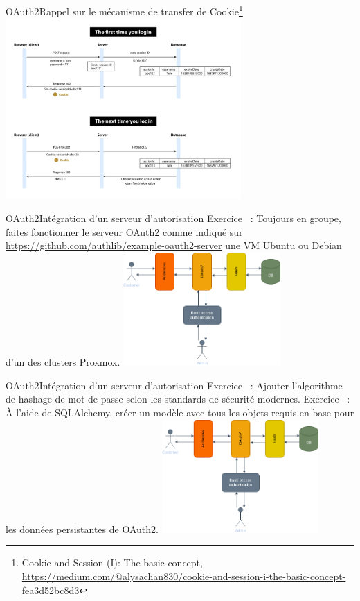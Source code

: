 \documentclass{beamer}
\begin{document}
    \begin{frame}{OAuth2}{Rappel sur le mécanisme de transfer de Cookie\footnote{Cookie and Session (I): The basic concept, \url{https://medium.com/@alysachan830/cookie-and-session-i-the-basic-concept-fea3d52bc8d3}}}
        \centering
        \includegraphics[width=9cm]{image/cookie-session}
    \end{frame}

    \begin{frame}{OAuth2}{Intégration d'un serveur d'autorisation}
        Exercice \execcounterdispinc{}~:
        Toujours en groupe, faites fonctionner le serveur OAuth2 comme indiqué sur \url{https://github.com/authlib/example-oauth2-server} une VM Ubuntu ou Debian d'un des clusters Proxmox.
        \bigbreak
        \centering
        \includegraphics[width=6cm]{image/OAuth2-integration.drawio}
    \end{frame}

    \begin{frame}{OAuth2}{Intégration d'un serveur d'autorisation}
        Exercice \execcounterdispinc{}~:
        Ajouter l'algorithme de hashage de mot de passe selon les standards de sécurité modernes.
        \bigbreak
        Exercice \execcounterdispinc{}~:
        À l'aide de SQLAlchemy, créer un modèle avec tous les objets requis en base pour les données persistantes de OAuth2.
        \bigbreak
        \centering
        \includegraphics[width=6cm]{image/OAuth2-integration.drawio}
    \end{frame}
\end{document}
